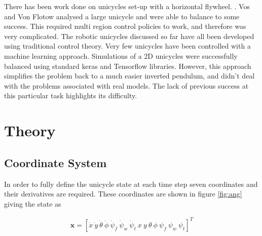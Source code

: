 \documentclass[twoside,twocolumn,12pt]{article}
\begin{document}
There has been work done on unicycles set-up with a horizontal flywheel. \cite{other3}. Vos and Von Flotow analysed a large unicycle and were able to balance to some success. This required multi region control policies to work, and therefore was very complicated.
\newline
The robotic unicycles discussed so far have all been developed using traditional control theory. Very few unicycles have been controlled with a machine learning approach. Simulations of a 2D unicycles were successfully balanced \cite{other4} using standard keras and Tensorflow libraries. However, this approach simplifies the problem back to a much easier inverted pendulum, and didn't deal with the problems associated with real models. The lack of previous success at this particular task highlights its difficulty.

\clearpage
\section{Theory}
\subsection{Coordinate System}
In order to fully define the unicycle state at each time step seven coordinates and their derivatives are required. These coordinates are shown in figure \ref{fig:ang} giving the state as

\begin{align*}
\textbf{x} = [\dot{x} \: \dot{y}\: \dot{\theta}\: \dot{\phi}\: \dot{\psi}_f\: \dot{\psi}_w \:\dot{\psi}_t \: x \: y \: \theta \: \phi \: \psi_f \: \psi_w \: \psi_t]^T
\end{align*}
\end{document}
